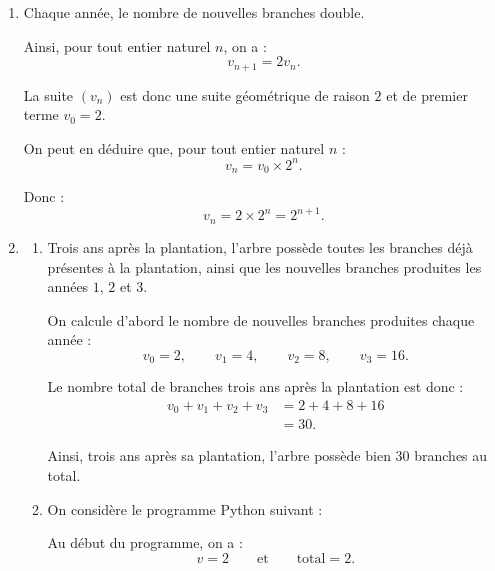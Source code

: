 \documentclass[10pt]{article}
\begin{document}
			\begin{enumerate}
				\item Chaque année, le nombre de nouvelles branches double.
				
				Ainsi, pour tout entier naturel $n$, on a :
				\[
				v_{n+1}=2v_n.
				\]
				
				La suite $(v_n)$ est donc une suite géométrique de raison $2$ et de premier terme $v_0=2$.
				
				On peut en déduire que, pour tout entier naturel $n$ :
				\[
				v_n=v_0\times 2^n.
				\]
				
				Donc :
				\[
				v_n=2\times 2^n=2^{n+1}.
				\]
				
				\item \begin{enumerate}
					\item Trois ans après la plantation, l'arbre possède toutes les branches déjà présentes à la plantation, ainsi que les nouvelles branches produites les années $1$, $2$ et $3$.
					
					On calcule d'abord le nombre de nouvelles branches produites chaque année :
					\[
					v_0=2,\qquad v_1=4,\qquad v_2=8,\qquad v_3=16.
					\]
					
					Le nombre total de branches trois ans après la plantation est donc :
					\begin{align*}
						v_0+v_1+v_2+v_3
						&=2+4+8+16\\
						&=30.
					\end{align*}
					
					Ainsi, trois ans après sa plantation, l'arbre possède bien $30$ branches au total.
					
					\item On considère le programme Python suivant :
					
					\begin{center}
					\end{center}
					
					Au début du programme, on a :
					\[
					v=2 \qquad \text{et} \qquad \text{total}=2.
					\]
					

\end{enumerate}
\end{enumerate}
\end{document}
